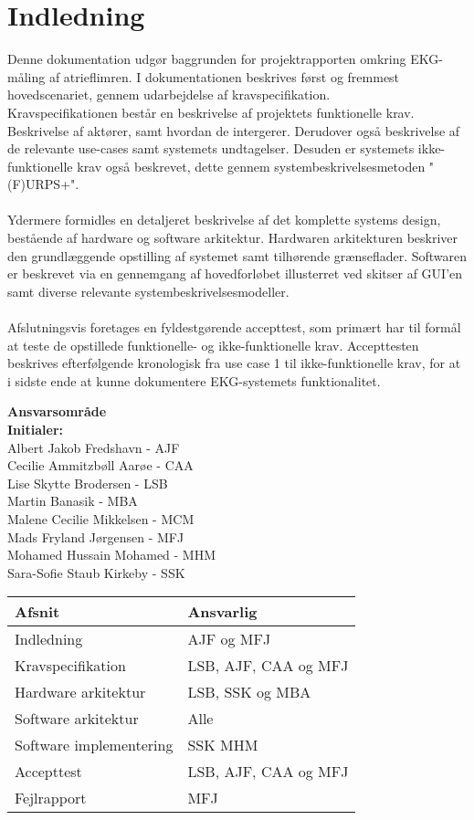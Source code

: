 \chapter{Indledning}
Denne dokumentation udgør baggrunden for projektrapporten omkring EKG-måling af atrieflimren. I dokumentationen beskrives først og fremmest hovedscenariet, gennem udarbejdelse af kravspecifikation. \\
Kravspecifikationen består en beskrivelse af projektets funktionelle krav. Beskrivelse af aktører, samt hvordan de intergerer. Derudover også beskrivelse af de relevante use-cases samt systemets undtagelser. Desuden er systemets ikke-funktionelle krav også beskrevet, dette gennem systembeskrivelsesmetoden "(F)URPS+".\\ \\
Ydermere formidles en detaljeret beskrivelse af det komplette systems design, bestående af hardware og software arkitektur. Hardwaren arkitekturen beskriver den grundlæggende opstilling af systemet samt tilhørende grænseflader. Softwaren er beskrevet via en gennemgang af hovedforløbet illusterret ved skitser af GUI'en samt diverse relevante systembeskrivelsesmodeller. \\ \\
Afslutningsvis foretages en fyldestgørende accepttest, som primært har til formål at teste de opstillede funktionelle- og ikke-funktionelle krav. Accepttesten beskrives efterfølgende kronologisk fra use case 1 til ikke-funktionelle krav, for at i sidste ende at kunne dokumentere EKG-systemets funktionalitet.

\textbf{Ansvarsområde} \\
\textbf{Initialer: } \\
Albert Jakob Fredshavn - AJF \\
Cecilie Ammitzbøll Aarøe - CAA \\
Lise Skytte Brodersen - LSB \\
Martin Banasik - MBA \\
Malene Cecilie Mikkelsen - MCM \\
Mads Fryland Jørgensen - MFJ \\
Mohamed Hussain Mohamed - MHM \\
Sara-Sofie Staub Kirkeby - SSK \\

\begin{longtabu} to 
    Afsnit &    Ansvarlig\\[-1ex]
    \midrule
    Indledning & AJF og MFJ \\
    Kravspecifikation & LSB, AJF, CAA og MFJ\\
    Hardware arkitektur & LSB, SSK og MBA\\
    Software arkitektur & Alle\\
    Software implementering & SSK MHM\\
    Accepttest & LSB, AJF, CAA og MFJ\\
    Fejlrapport & MFJ\\
    
    
    

\end{longtabu}